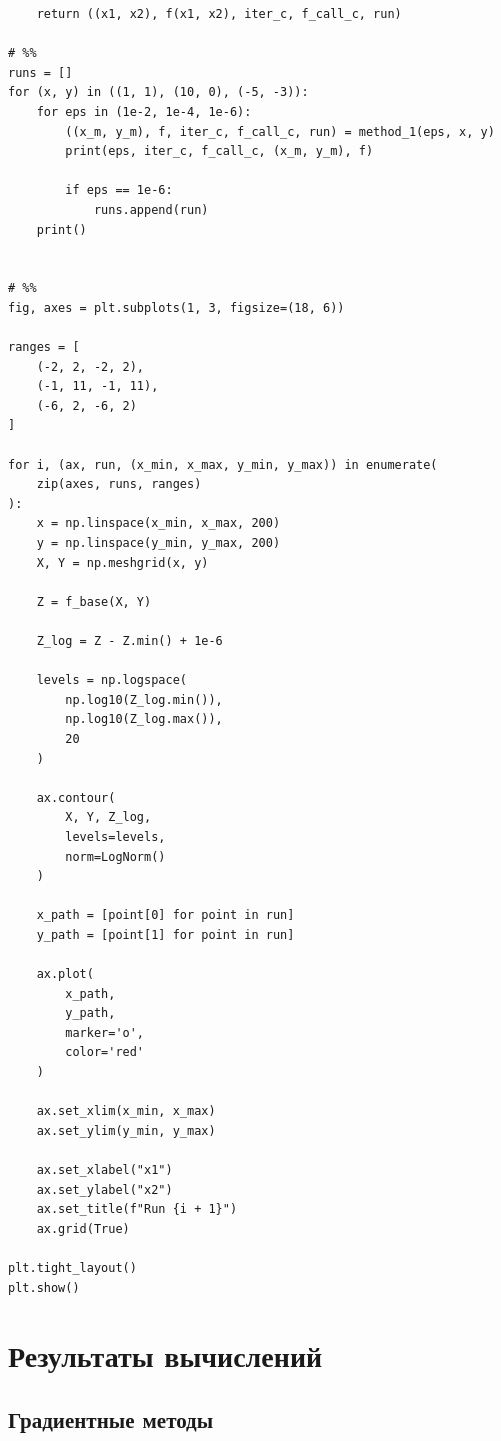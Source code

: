 \documentclass[12pt, letterpaper]{article}
\begin{document}
\begin{lstlisting}
    return ((x1, x2), f(x1, x2), iter_c, f_call_c, run)

# %%
runs = []
for (x, y) in ((1, 1), (10, 0), (-5, -3)):
    for eps in (1e-2, 1e-4, 1e-6): 
        ((x_m, y_m), f, iter_c, f_call_c, run) = method_1(eps, x, y)
        print(eps, iter_c, f_call_c, (x_m, y_m), f)

        if eps == 1e-6:
            runs.append(run)
    print()


# %%
fig, axes = plt.subplots(1, 3, figsize=(18, 6))

ranges = [
    (-2, 2, -2, 2),
    (-1, 11, -1, 11),
    (-6, 2, -6, 2)
]

for i, (ax, run, (x_min, x_max, y_min, y_max)) in enumerate(
    zip(axes, runs, ranges)
):
    x = np.linspace(x_min, x_max, 200)
    y = np.linspace(y_min, y_max, 200)
    X, Y = np.meshgrid(x, y)

    Z = f_base(X, Y)

    Z_log = Z - Z.min() + 1e-6

    levels = np.logspace(
        np.log10(Z_log.min()),
        np.log10(Z_log.max()),
        20
    )

    ax.contour(
        X, Y, Z_log,
        levels=levels,
        norm=LogNorm()
    )

    x_path = [point[0] for point in run]
    y_path = [point[1] for point in run]

    ax.plot(
        x_path,
        y_path,
        marker='o',
        color='red'
    )

    ax.set_xlim(x_min, x_max)
    ax.set_ylim(y_min, y_max)

    ax.set_xlabel("x1")
    ax.set_ylabel("x2")
    ax.set_title(f"Run {i + 1}")
    ax.grid(True)

plt.tight_layout()
plt.show()
\end{lstlisting}

\section{Результаты вычислений}
\subsection*{Градиентные методы}

\begin{center}
\small
{}
\end{center}
\end{document}

